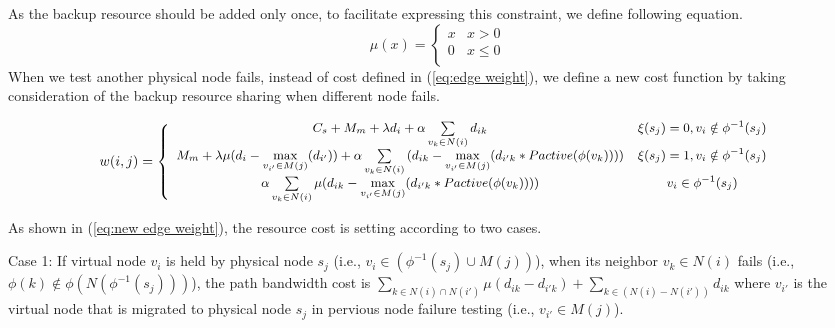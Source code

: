 As the backup resource should be added  only once, to facilitate expressing  this constraint, we define following equation.
\begin{equation}
\mu (x) = \left\{ {\begin{array}{*{20}{c}}
   x & {x > 0}  \\
   0 & {x \le 0}  \\
\end{array}} \right.
\end{equation}
When we test another physical node fails, instead of cost defined in (\ref{eq:edge weight}), we define a new cost function by taking consideration of the backup resource sharing when different node fails.
\begin{figure}
  \centering
    \begin{equation}
  \footnotesize
w(i,j) = \left\{ {\begin{array}{*{20}{c}}
   {C_s+{M_m}+\lambda {d_i}+\alpha \sum\limits_{v_k \in N(i)} {{d_{ik}}}}&{\xi(s_j)=0,v_i\notin \phi^{-1}(s_j)} \\
   {{M_m}+ \lambda \mu({d_i} - \mathop {\max }\limits_{{v_{i'}\in M(j)}} ( {{d_{i'}}} )) +\alpha\sum\limits_{v_k \in N(i)} {({d_{ik}} - \max\limits_{{v_{i'}\in M(j)}}({d_{i'k}}*{Pactive(\phi(v_k))}))}} & {\xi(s_j)=1,v_i\notin \phi^{-1}(s_j) }  \\
   { \alpha\sum\limits_{v_k \in N(i)} {\mu({d_{ik}} - \max\limits_{{v_{i'}\in M(j)}}({d_{i'k}}*{Pactive(\phi(v_k))}))}}  & {v_i\in \phi^{-1}(s_j)}  \\
\end{array}} \right.
    \label{eq:new edge weight}
    \end{equation}
\end{figure}

As shown in (\ref{eq:new edge weight}), the resource cost is setting according to two cases.

Case 1: If virtual node $v_i$ is held by  physical node $s_j$ (i.e., ${{v_i} \in \left( {{\phi ^{ - 1}}({s_j}) \cup M(j)} \right)}$), when its neighbor $v_k \in N(i)$ fails (i.e., ${\phi \left( k \right) \notin \phi \left(N\left( {{\phi ^{ - 1}}({s_j})} \right)\right)}$), the path bandwidth cost is ${\sum\limits_{k \in N(i) \cap N(i')} {\mu({d_{ik}} - {d_{i'k}})}  + \sum\limits_{k \in \left( {N(i) - N(i')} \right)} {{d_{ik}}} }$ where ${v_{i'}}$ is the  virtual node that is migrated to physical node $s_j$ in pervious node failure testing (i.e., ${v_{i'}} \in M(j)$).

